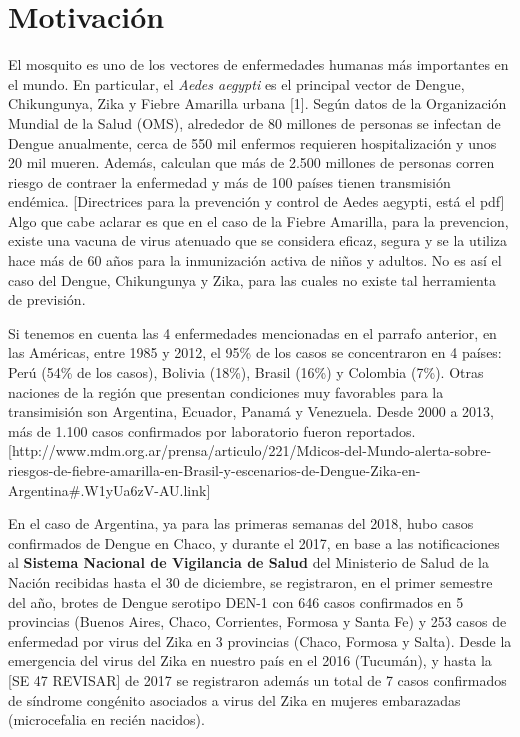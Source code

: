 



\chapter{Motivación}

\justifying
\par El mosquito es uno de los vectores de enfermedades humanas más importantes
  en el mundo. En particular, el \textit{Aedes aegypti} es el principal vector
  de Dengue, Chikungunya, Zika y Fiebre Amarilla urbana [1].
  Según datos de la Organización Mundial de la Salud (OMS), alrededor de 80 millones de
  personas se infectan de Dengue anualmente, cerca de 550 mil enfermos requieren hospitalización y
  unos 20 mil mueren. Además, calculan que más de 2.500 millones de personas corren
  riesgo de contraer la enfermedad y más de 100 países tienen transmisión endémica.
  [Directrices para la prevención y control de Aedes aegypti, está el pdf]
  Algo que cabe aclarar es que en el caso de la Fiebre Amarilla, para la
  prevencion, existe una vacuna de virus atenuado que se considera eficaz, segura
  y se la utiliza hace más de 60 años para la inmunización activa de niños y
  adultos. No es así el caso del Dengue,
  Chikungunya y Zika, para las cuales no existe tal herramienta de previsión.

\par Si tenemos en cuenta las 4 enfermedades mencionadas en el parrafo anterior,
  en las Américas, entre 1985 y 2012, el 95\% de los casos se concentraron en
  4 países: Perú (54\% de los casos), Bolivia (18\%), Brasil (16\%) y Colombia (7\%).
  Otras naciones de la región que presentan condiciones muy
  favorables para la transimisión son Argentina, Ecuador, Panamá y Venezuela.
  Desde 2000 a 2013, más de 1.100 casos confirmados por laboratorio fueron
  reportados.
  [http://www.mdm.org.ar/prensa/articulo/221/Mdicos-del-Mundo-alerta-sobre-riesgos-de-fiebre-amarilla-en-Brasil-y-escenarios-de-Dengue-Zika-en-Argentina\#.W1yUa6zV-AU.link]

\par En el caso de Argentina, ya para las primeras semanas del 2018, hubo casos confirmados
  de Dengue en Chaco, y durante el 2017, en base a las notificaciones al
  \textbf{Sistema Nacional de Vigilancia de Salud} del Ministerio de Salud de la Nación
  recibidas hasta el 30 de diciembre, se registraron, en el primer semestre del año, brotes de
  Dengue serotipo DEN-1 con 646 casos confirmados en 5 provincias
  (Buenos Aires, Chaco, Corrientes, Formosa y Santa Fe) y 253 casos de enfermedad
  por virus del Zika en 3 provincias (Chaco, Formosa y Salta).
  Desde la emergencia del virus del Zika en nuestro país en el 2016 (Tucumán), y hasta
  la [SE 47 REVISAR] de 2017 se registraron además un total de 7 casos confirmados de
  síndrome congénito asociados a virus del Zika en mujeres embarazadas
  (microcefalia en recién nacidos).

